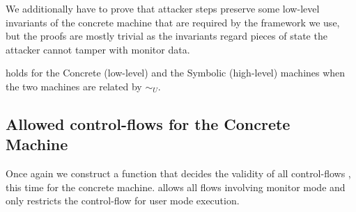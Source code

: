 We additionally have to prove that attacker steps preserve some low-level
invariants of the concrete machine that are required by the framework we
use, but the proofs are mostly trivial as the invariants regard pieces of
state the attacker cannot tamper with \EG monitor data.

\begin{theorem}
\label{simulation_CS_attacker}
 holds for the Concrete (low-level) and
the Symbolic (high-level) machines when the two machines are related
by $\sim_U$.
\end{theorem}

\subsection{Allowed control-flows for the Concrete Machine}
\label{sec:concrete_flow}

Once again we construct a function that decides the validity of all
control-flows , this time for the concrete machine. 
allows all flows involving monitor mode and only restricts
the control-flow for user mode execution.

